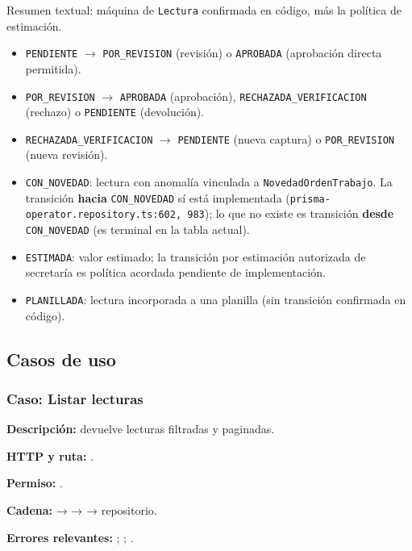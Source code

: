 Resumen textual: máquina de \texttt{Lectura} confirmada en código, más la política de estimación.

\begin{itemize}
\item \texttt{PENDIENTE} $\rightarrow$ \texttt{POR\_REVISION} (revisión) o \texttt{APROBADA} (aprobación directa permitida).
\item \texttt{POR\_REVISION} $\rightarrow$ \texttt{APROBADA} (aprobación), \texttt{RECHAZADA\_VERIFICACION} (rechazo) o \texttt{PENDIENTE} (devolución).
\item \texttt{RECHAZADA\_VERIFICACION} $\rightarrow$ \texttt{PENDIENTE} (nueva captura) o \texttt{POR\_REVISION} (nueva revisión).
\item \texttt{CON\_NOVEDAD}: lectura con anomalía vinculada a \texttt{NovedadOrdenTrabajo}. La transición \textbf{hacia} \texttt{CON\_NOVEDAD} sí está implementada (\texttt{prisma-operator.repository.ts:602, 983}); lo que no existe es transición \textbf{desde} \texttt{CON\_NOVEDAD} (es terminal en la tabla actual).
\item \texttt{ESTIMADA}: valor estimado; la transición por estimación autorizada de secretaría es política acordada pendiente de implementación.
\item \texttt{PLANILLADA}: lectura incorporada a una planilla (sin transición confirmada en código).
\end{itemize}


\subsection{Casos de uso}


\subsubsection{Caso: Listar lecturas}


\textbf{Descripción:} devuelve lecturas filtradas y paginadas.  

\textbf{HTTP y ruta:} \texttt{}.  

\textbf{Permiso:} \texttt{}.  

\textbf{Cadena:} \texttt{} → \texttt{} → \texttt{} → repositorio.  

\textbf{Errores relevantes:} \texttt{}; \texttt{}; \texttt{}.  

